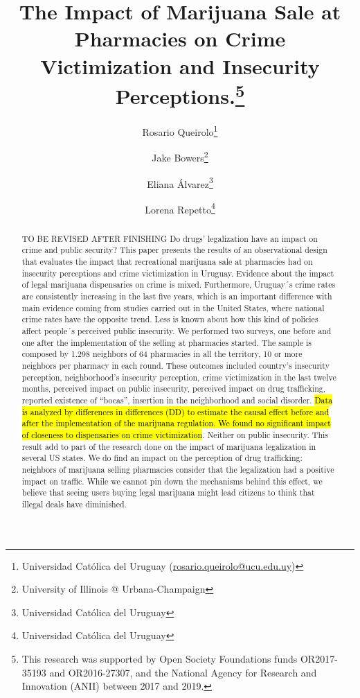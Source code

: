 \documentclass[11pt]{article}
\author{Rosario Queirolo\thanks{Universidad Católica del Uruguay (\url{rosario.queirolo@ucu.edu.uy})}
	\and Jake Bowers\thanks{University of Illinois @ Urbana-Champaign}
	\and Eliana Álvarez\thanks{Universidad Católica del Uruguay}
	\and Lorena Repetto\thanks{Universidad Católica del Uruguay}}
\title {The Impact of Marijuana Sale at Pharmacies on Crime Victimization and Insecurity Perceptions.\thanks{This research was supported by Open Society Foundations funds OR2017-35193 and OR2016-27307, and the National Agency for Research and Innovation (ANII) between 2017 and 2019.}}
\begin{document}

\maketitle

 
\begin{abstract}

TO BE REVISED AFTER FINISHING Do drugs' legalization have an impact on crime and public security? This paper presents the results of an observational design that evaluates the impact that recreational marijuana sale at pharmacies had on insecurity perceptions and crime victimization in Uruguay. Evidence about the impact of legal marijuana dispensaries on crime is mixed. Furthermore, Uruguay´s crime rates are consistently increasing in the last five years, which is an important difference with main evidence coming from studies carried out in the United States, where national crime rates have the opposite trend. Less is known about how this kind of policies affect people´s perceived public insecurity. We performed two surveys, one before and one after the implementation of the selling at pharmacies started. The sample is composed by 1.298 neighbors of 64 pharmacies in all the territory, 10 or more neighbors per pharmacy in each round. These outcomes included country’s insecurity perception, neighborhood’s insecurity perception, crime victimization in the last twelve months, perceived impact on public insecurity, perceived impact on drug trafficking, reported existence of ``bocas'', insertion in the neighborhood and social disorder. \hl{Data is analyzed by differences in differences (DD) to estimate the causal effect before and after the implementation of the marijuana regulation. We found no significant impact of closeness to dispensaries on crime victimization}. Neither on public insecurity. This result add to part of the research done on the impact of marijuana legalization in several US states. We do find an impact on the perception of drug trafficking: neighbors of marijuana selling pharmacies consider that the legalization had a positive impact on traffic. While we cannot pin down the mechanisms behind this effect, we believe that seeing users buying legal marijuana might lead citizens to think that illegal deals have diminished.
\end{abstract}
\end{document}
